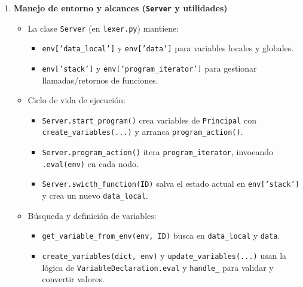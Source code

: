 \documentclass{article}
\begin{document}
\begin{enumerate}
  \item \textbf{Manejo de entorno y alcances (\texttt{Server} y utilidades)}  
    \begin{itemize}
      \item La clase \texttt{Server} (en \texttt{lexer.py}) mantiene:
        \begin{itemize}
          \item \texttt{env['data\_local']} y \texttt{env['data']} para variables locales y globales.
          \item \texttt{env['stack']} y \texttt{env['program\_iterator']} para gestionar llamadas/retornos de funciones.
        \end{itemize}
      \item Ciclo de vida de ejecución:
        \begin{itemize}
          \item \texttt{Server.start\_program()} crea variables de \texttt{Principal} con \texttt{create\_variables(...)} y arranca \texttt{program\_action()}.
          \item \texttt{Server.program\_action()} itera \texttt{program\_iterator}, invocando \texttt{.eval(env)} en cada nodo.
          \item \texttt{Server.swicth\_function(ID)} salva el estado actual en \texttt{env['stack']} y crea un nuevo \texttt{data\_local}.
        \end{itemize}
      \item Búsqueda y definición de variables:
        \begin{itemize}
          \item \texttt{get\_variable\_from\_env(env, ID)} busca en \texttt{data\_local} y \texttt{data}.
          \item \texttt{create\_variables(dict, env)} y \texttt{update\_variables(...)} usan la lógica de \texttt{VariableDeclaration.eval} y \texttt{handle\_\*} para validar y convertir valores.
        \end{itemize}
    \end{itemize}


\end{enumerate}
\end{document}
